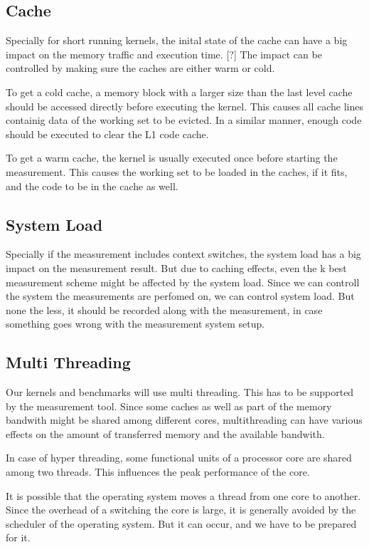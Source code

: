 \documentclass[a4paper,12pt]{article}
\begin{document}
\subsection{Cache}
Specially for short running kernels, the inital state of the cache can have a big impact on the memory traffic and execution time. [?] The impact can be controlled by making sure the caches are either warm or cold.

To get a cold cache, a memory block with a larger size than the last level cache should be accessed directly before executing the kernel. This causes all cache lines containig data of the working set to be evicted. In a similar manner, enough code should be executed to clear the L1 code cache.

To get a warm cache, the kernel is usually executed once before starting the measurement. This causes the working set to be loaded in the caches, if it fits, and the code to be in the cache as well.

\subsection{System Load}
Specially if the measurement includes context switches, the system load has a big impact on the measurement result. But due to caching effects, even the k best measurement scheme might be affected by the system load. Since we can controll the system the measurements are perfomed on, we can control system load. But none the less, it should be recorded along with the measurement, in case something goes wrong with the measurement system setup.

\subsection{Multi Threading}
Our kernels and benchmarks will use multi threading. This has to be supported by the measurement tool. Since some caches as well as part of the memory bandwith might be shared among different cores, multithreading can have various effects on the amount of transferred memory and the available bandwith.

In case of hyper threading, some functional units of a processor core are shared among two threads. This influences the peak performance of the core.

It is possible that the operating system moves a thread from one core to another. Since the overhead of a switching the core is large, it is generally avoided by the scheduler of the operating system. But it can occur, and we have to be prepared for it.
\end{document}
